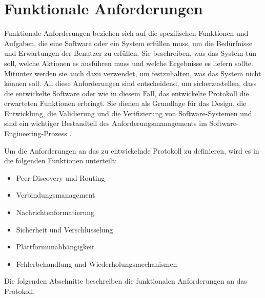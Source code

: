 \section{Funktionale Anforderungen}



Funktionale Anforderungen beziehen sich auf die spezifischen Funktionen und Aufgaben, die eine Software oder ein System erfüllen muss, um die Bedürfnisse und Erwartungen der Benutzer zu erfüllen. Sie beschreiben, was das System tun soll, welche Aktionen es ausführen muss und welche Ergebnisse es liefern sollte. Mitunter werden sie auch dazu verwendet, um festzuhalten, was das System nicht können soll. All diese Anforderungen sind entscheidend, um sicherzustellen, dass die entwickelte Software oder wie in diesem Fall, das entwickelte Protokoll die erwarteten Funktionen erbringt. Sie dienen als Grundlage für das Design, die Entwicklung, die Validierung und die Verifizierung von Software-Systemen und sind ein wichtiger Bestandteil des Anforderungsmanagements im Software-Engineering-Prozess \parencite[S. 124-126]{Sommerville_AnfAnalyse}.

Um die Anforderungen an das zu entwickelnde Protokoll zu definieren, wird es in die folgenden
Funktionen unterteilt:

\begin{itemize}
    \item Peer-Discovery und Routing
    \item Verbindungsmanagement
    \item Nachrichtenformatierung
    \item Sicherheit und Verschlüsselung
    \item Plattformunabhängigkeit
    \item Fehlerbehandlung und Wiederholungsmechanismen
\end{itemize}

\noindent Die folgenden Abschnitte beschreiben die funktionalen Anforderungen an das Protokoll.







 

%
%